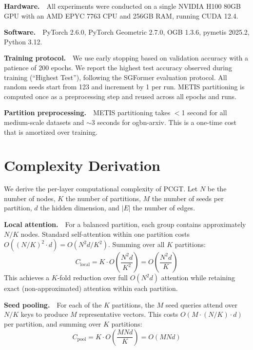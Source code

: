 \documentclass[sigconf]{acmart}
\begin{document}
\textbf{Hardware.}~~All experiments were conducted on a single NVIDIA H100 80GB GPU with an AMD EPYC 7763 CPU and 256GB RAM, running CUDA 12.4.

\textbf{Software.}~~PyTorch 2.6.0, PyTorch Geometric 2.7.0, OGB 1.3.6, pymetis 2025.2, Python 3.12.

\textbf{Training protocol.}~~We use early stopping based on validation accuracy with a patience of 200 epochs. We report the highest test accuracy observed during training (``Highest Test''), following the SGFormer evaluation protocol. All random seeds start from 123 and increment by 1 per run. METIS partitioning is computed once as a preprocessing step and reused across all epochs and runs.

\textbf{Partition preprocessing.}~~METIS partitioning takes $<$1 second for all medium-scale datasets and $\sim$3 seconds for ogbn-arxiv. This is a one-time cost that is amortized over training.

\section{Complexity Derivation}
\label{app:complexity}

We derive the per-layer computational complexity of PCGT. Let $N$ be the number of nodes, $K$ the number of partitions, $M$ the number of seeds per partition, $d$ the hidden dimension, and $|E|$ the number of edges.

\textbf{Local attention.}~~For a balanced partition, each group contains approximately $N/K$ nodes. Standard self-attention within one partition costs $O((N/K)^2 \cdot d) = O(N^2 d / K^2)$. Summing over all $K$ partitions:
\begin{equation}
C_\text{local} = K \cdot O\!\left(\frac{N^2 d}{K^2}\right) = O\!\left(\frac{N^2 d}{K}\right)
\label{eq:local_cost}
\end{equation}
This achieves a $K$-fold reduction over full $O(N^2 d)$ attention while retaining exact (non-approximated) attention within each partition.

\textbf{Seed pooling.}~~For each of the $K$ partitions, the $M$ seed queries attend over $N/K$ keys to produce $M$ representative vectors. This costs $O(M \cdot (N/K) \cdot d)$ per partition, and summing over $K$ partitions:
\begin{equation}
C_\text{pool} = K \cdot O\!\left(\frac{MNd}{K}\right) = O(MNd)
\label{eq:pool_cost}
\end{equation}
\end{document}
